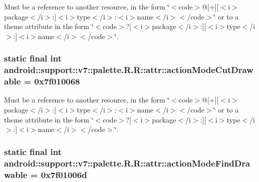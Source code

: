 Must be a reference to another resource, in the form \char`\"{}$<$code$>$@\mbox{[}+\mbox{]}\mbox{[}$<$i$>$package$<$/i$>$:\mbox{]}$<$i$>$type$<$/i$>$:$<$i$>$name$<$/i$>$$<$/code$>$\char`\"{} or to a theme attribute in the form \char`\"{}$<$code$>$?\mbox{[}$<$i$>$package$<$/i$>$:\mbox{]}\mbox{[}$<$i$>$type$<$/i$>$:\mbox{]}$<$i$>$name$<$/i$>$$<$/code$>$\char`\"{}. \hypertarget{classandroid_1_1support_1_1v7_1_1palette_1_1_r_1_1attr_f687e483cc1f85f1a2ed91cd27bf211d}{
\subsubsection[{actionModeCutDrawable}]{\setlength{\rightskip}{0pt plus 5cm}static final int android::support::v7::palette.R.R::attr::actionModeCutDrawable = 0x7f010068}}
\label{classandroid_1_1support_1_1v7_1_1palette_1_1_r_1_1attr_f687e483cc1f85f1a2ed91cd27bf211d}


Must be a reference to another resource, in the form \char`\"{}$<$code$>$@\mbox{[}+\mbox{]}\mbox{[}$<$i$>$package$<$/i$>$:\mbox{]}$<$i$>$type$<$/i$>$:$<$i$>$name$<$/i$>$$<$/code$>$\char`\"{} or to a theme attribute in the form \char`\"{}$<$code$>$?\mbox{[}$<$i$>$package$<$/i$>$:\mbox{]}\mbox{[}$<$i$>$type$<$/i$>$:\mbox{]}$<$i$>$name$<$/i$>$$<$/code$>$\char`\"{}. \hypertarget{classandroid_1_1support_1_1v7_1_1palette_1_1_r_1_1attr_6dfbfb8229a3cf788d060c757e2dff56}{
\subsubsection[{actionModeFindDrawable}]{\setlength{\rightskip}{0pt plus 5cm}static final int android::support::v7::palette.R.R::attr::actionModeFindDrawable = 0x7f01006d}}
\label{classandroid_1_1support_1_1v7_1_1palette_1_1_r_1_1attr_6dfbfb8229a3cf788d060c757e2dff56}


